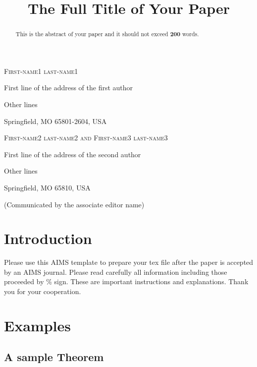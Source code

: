 \documentclass{aims}
\title[Running heading with forty characters or less]
      {The Full Title of Your Paper}
\author[first-name1 last-name1 and first-name2 last-name2]{}
\theoremstyle{definition}
\begin{document}
\maketitle

\centerline{\scshape First-name1 last-name1 }
\medskip
{\footnotesize
 \centerline{First line of the address of the first author}
   \centerline{Other lines}
   \centerline{ Springfield, MO 65801-2604, USA}
} %

\medskip

\centerline{\scshape First-name2 last-name2 and First-name3
last-name3}
\medskip
{\footnotesize
 \centerline{ First line of the address of the second author}
   \centerline{Other lines}
   \centerline{Springfield, MO 65810, USA}
}

\bigskip

 \centerline{(Communicated by the associate editor name)}


\begin{abstract}
This is the abstract of your paper and it should not exceed
\textbf{200} words.
\end{abstract}

\section{Introduction}

Please use this AIMS template to prepare your tex file after the
paper is accepted by an AIMS journal. Please read carefully all
information including those proceeded by \% sign. These are
important instructions and explanations. Thank you for your
cooperation.

\section{Examples}

\subsection{A sample Theorem}
\end{document}
